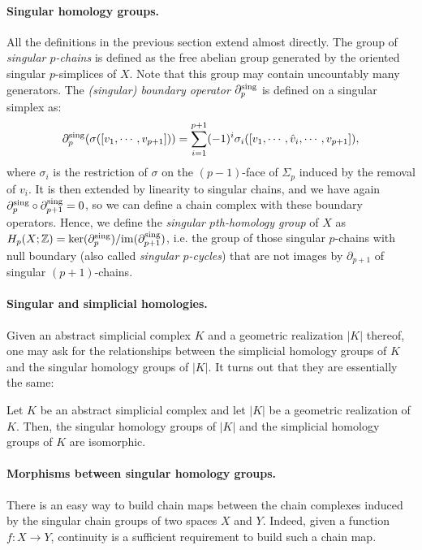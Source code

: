 \paragraph*{Singular homology groups.} All the definitions in the previous section extend almost directly.
The group of {\em singular $p$-chains} is defined as the free abelian group generated by the oriented singular
$p$-simplices of $X$. Note that this group may contain uncountably many generators.
The {\em (singular) boundary operator} $\partial^{\rm sing}_p$ is defined on a singular simplex as:
$$\partial^{\rm sing}_p(\sigma([v_1,\cdots,v_{p+1}]))=\sum_{i=1}^{p+1}(-1)^i \sigma_i([v_1,\cdots,\hat v_i,\cdots,v_{p+1}]),$$
where $\sigma_i$ is the restriction of $\sigma$ on the $(p-1)$-face of $\Sigma_p$ induced by the removal of $v_i$.
It is then extended by linearity to singular chains, and
we have again $\partial^{\rm sing}_p\circ\partial^{\rm sing}_{p+1}=0$, so we can define a chain complex with these boundary operators.
Hence, we define the {\em singular  $p$th-homology group} of $X$ as $H_p(X;\mathbb{Z})=\ker(\partial^{\rm sing}_p)/\mathrm{im}(\partial^{\rm sing}_{p+1})$,
i.e. the group of those singular $p$-chains with null boundary (also called {\em singular $p$-cycles}) 
that are not images by $\partial_{p+1}$ of singular $(p+1)$-chains.  

\paragraph*{Singular and simplicial homologies.} Given an abstract simplicial complex $K$
and a geometric realization $|K|$ thereof, one may ask for the relationships between the
simplicial homology groups of $K$ and the singular homology groups of $|K|$.
It turns out that they are essentially the same:

\begin{prop}\label{prop:SingSimpl}
Let $K$ be an abstract simplicial complex and let $|K|$ be a geometric realization of $K$.
Then, the singular homology groups of $|K|$ and the simplicial homology groups of $K$ are isomorphic.
\end{prop}

\paragraph*{Morphisms between singular homology groups.}
There is an easy way to build chain maps between the chain complexes induced by the singular chain groups of two spaces $X$ and $Y$.
Indeed, given a function $f:X\rightarrow Y$, continuity is a sufficient requirement to build such a chain map.

